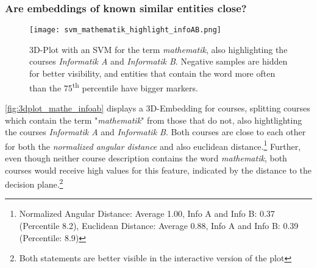 
\subsubsection{Are embeddings of known similar entities close?}

\begin{figure}[H]
	\centering
	\texttt{[image: svm\_mathematik\_highlight\_infoAB.png]}
	\caption[3D-Plot with an SVM for the term \textit{mathematik}]{
		\label{fig:3dplot_mathe_infoab}
		3D-Plot with an SVM for the term \textit{mathematik}, also highlighting the courses \textit{Informatik A} and \textit{Informatik B}. Negative samples are hidden for better visibility, and entities that contain the word more often than the 75\textsuperscript{th} percentile have bigger markers.
	}
\end{figure}

\autoref{fig:3dplot_mathe_infoab} displays a 3D-Embedding for courses, splitting courses which contain the term "\textit{mathematik}" from those that do not, also hightlighting the courses \textit{Informatik A} and \textit{Informatik B}. Both courses are close to each other for both the \textit{normalized angular distance} and also euclidean distance.\footnote{Normalized Angular Distance: Average 1.00, Info A and Info B: 0.37 (Percentile 8.2), Euclidean Distance: Average 0.88, Info A and Info B: 0.39 (Percentile: 8.9)}
Further, even though neither course description contains the word \textit{mathematik}, both courses would receive high values for this feature, indicated by the distance to the decision plane.\footnote{Both statements are better visible in the interactive version of the plot}

